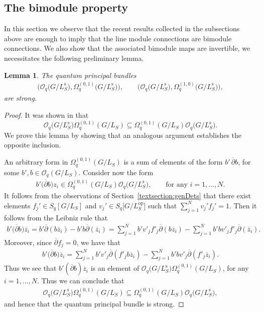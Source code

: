 \documentclass[10pt,a4paper]{amsart}
\numberwithin{equation}{section}
\newtheorem{lem}[Theorem]{Lemma}
\newcommand\adel{\overline{\partial}}
\newcommand{\qphs}{\mathcal{O}_q\big(G/L^{\mathrm{s}}_S\big)}
\begin{document}
\subsection{The bimodule property}\label{section3.4}

In this section we observe that the recent results collected in the subsections above are enough to imply that the line module connections are bimodule connections. We also show that the associated bimodule maps are invertible, we necessitates the following preliminary lemma.

\begin{lem}The quantum principal bundles
\begin{gather*}
\big(\mathcal{O}_q\big(G/L_S^{\mathrm{s}}\big),  \Omega^{(0,1)}_q\big(G/L_S^{\mathrm{s}}\big)\big), \qquad \big(\mathcal{O}_q\big(G/L_S^{\mathrm{s}}\big),   \Omega^{(1,0)}_q\big(G/L_S^{\mathrm{s}}\big)\big),
\end{gather*}
are strong.
\end{lem}
\begin{proof}
It was shown in \cite[Lemma 5.7]{CDOBBW} that
\[
\qphs\Omega^{(0,1)}_q(G/L_S) \subseteq \Omega^{(0,1)}_q(G/L_S)\qphs.
\]
We prove this lemma by showing that an analogous argument establishes the opposite inclusion.

An arbitrary form in $\Omega^{(0,1)}_q(G/L_S)$ is a sum of elements of the form $b'\,\adel b$, for some $b',b \in \mathcal{O}_q(G/L_S)$. Consider now the form
\begin{gather*}
b'\big(\adel b\big)z_i \in \Omega^{(0,1)}_q(G/L_S)\qphs , \qquad \textrm{for any } i = 1, \dots, N.
\end{gather*}
It follows from the observations of Section~\ref{textsection:genDets} that there exist elements $f_j'\in S_q[G/L_S]$ and $v_j' \in S_q\big[G/L^{\mathrm{op}}_S\big]$ such that $\sum_{j=1}^N v_j'f_j'=1$. Then it follows from the Leibniz rule that
\begin{gather*}
b'\big(\adel b\big)\overline{z}_i = b'\adel(b\overline{z}_i) - b'b\adel(\overline{z}_i) = \sum_{j=1}^N b'v'_jf'_j\adel(b\overline{z}_i) - \sum_{j=1}^N b'bv'_jf'_j\adel(\overline{z}_i).
\end{gather*}
Moreover, since $\adel f_j = 0$, we have that
\begin{gather*}
b'\big(\adel b\big)\overline{z}_i = \sum_{j=1}^N b'v'_j\adel(f'_jb\overline{z}_i) - \sum_{j=1}^N b'bv'_j\adel(f'_j\overline{z}_i).
\end{gather*}
Thus we see that $b'(\adel b)\overline{z}_i$ is an element of $\qphs\Omega^{(0,1)}_q(G/L_S)$, for any $i = 1, \dots, N$. Thus we can conclude that
\begin{gather*}
\qphs \Omega^{(0,1)}_q(G/L_S) \subseteq \Omega^{(0,1)}_q(G/L_S)\qphs,
\end{gather*}
and hence that the quantum principal bundle is strong.
\end{proof}
\end{document}
